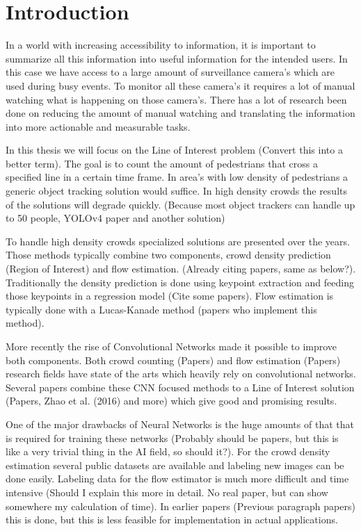 \chapter{Introduction}
In a world with increasing accessibility to information, it is important to summarize all this information into useful information for the intended users. In this case we have access to a large amount of surveillance camera's which are used during busy events. To monitor all these camera's it requires a lot of manual watching what is happening on those camera's. There has a lot of research been done on reducing the amount of manual watching and translating the information into more actionable and measurable tasks.

In this thesis we will focus on the Line of Interest problem (Convert this into a better term). The goal is to count the amount of pedestrians that cross a specified line in a certain time frame. In area's with low density of pedestrians a generic object tracking solution would suffice. In high density crowds the results of the solutions will degrade quickly. (Because most object trackers can handle up to 50 people, YOLOv4 paper and another solution)

To handle high density crowds specialized solutions are presented over the years. Those methods typically combine two components, crowd density prediction (Region of Interest) and flow estimation. (Already citing papers, same as below?). Traditionally the density prediction is done using keypoint extraction and feeding those keypoints in a regression model (Cite some papers). Flow estimation is typically done with a Lucas-Kanade method (papers who implement this method).

More recently the rise of Convolutional Networks made it possible to improve both components. Both crowd counting (Papers) and flow estimation (Papers) research fields have state of the arts which heavily rely on convolutional networks. Several papers combine these CNN focused methods to a Line of Interest solution (Papers, Zhao et al. (2016) and more) which give good and promising results.

One of the major drawbacks of Neural Networks is the huge amounts of that that is required for training these networks (Probably should be papers, but this is like a very trivial thing in the AI field, so should it?). For the crowd density estimation several public datasets are available and labeling new images can be done easily. Labeling data for the flow estimator is much more difficult and time intensive (Should I explain this more in detail. No real paper, but can show somewhere my calculation of time). In earlier papers (Previous paragraph papers) this is done, but this is less feasible for implementation in actual applications.

